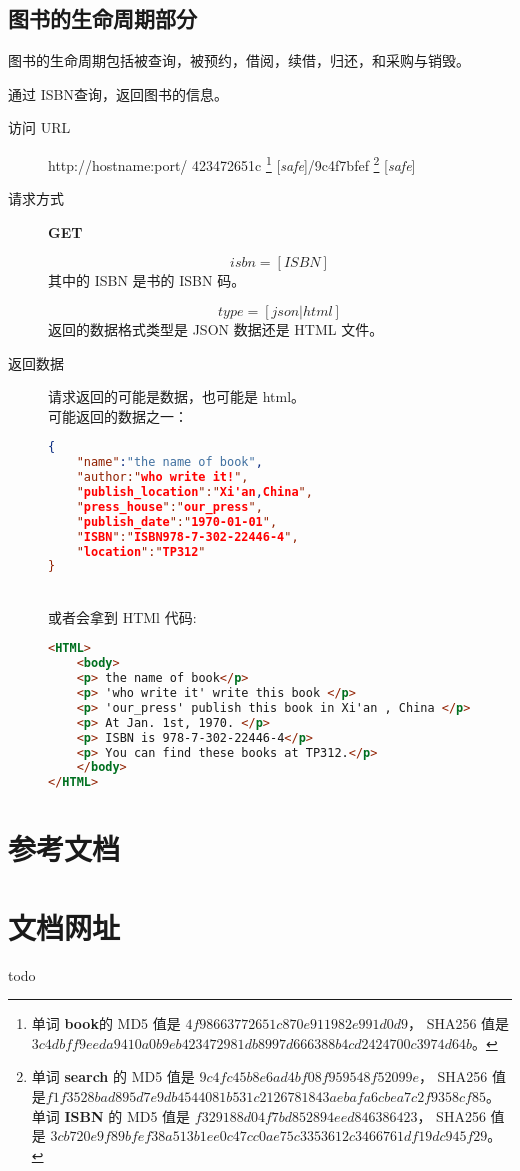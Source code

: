 \documentclass[UTF8]{article}
\def\safe{[\textit{safe}]}
\def\GET{\textbf{GET}}
\begin{document}
        \subsection{图书的生命周期部分}
        图书的生命周期包括被查询，被预约，借阅，续借，归还，和采购与销毁。






        通过 ISBN查询，返回图书的信息。
        \begin{description}

        	\item[访问 URL] http://hostname:port/
        	423472651c
        	\footnote{单词 \textbf{book}的
        		MD5 值是 $4f98663772651c870e911982e991d0d9$，
        		SHA256 值是 $3c4dbff9eeda9410a0b9eb423472981db8997d666388b4cd2424700c3974d64b$。
        		}
	        \safe/9c4f7bfef
	        \footnote{
	        	单词 \textbf{search} 的
	        	MD5 值是 $9c4fc45b8e6ad4bf08f959548f52099e$，
	        	SHA256 值是$f1f3528bad895d7e9db4544081b531c2126781843aebafa6cbea7c2f9358cf85$。
	        	单词 \textbf{ISBN} 的
	        	MD5 值是 $f329188d04f7bd852894eed846386423$，
	        	SHA256 值是 $3cb720e9f89bfef38a513b1ee0c47cc0ae75c3353612c3466761df19dc945f29$。
	        	}
	        \safe


	        \item[请求方式] \GET


	        $$isbn=[ISBN]$$
	        其中的 ISBN 是书的 ISBN 码。


	        $$type=[json|html]$$
	        返回的数据格式类型是 JSON 数据还是 HTML 文件。

	        \item[返回数据] 请求返回的可能是数据，也可能是 html。
	        \\ 可能返回的数据之一：
	        \begin{lstlisting}[language=JSON]
{
	"name":"the name of book",
	"author:"who write it!",
	"publish_location":"Xi'an,China",
	"press_house":"our_press",
	"publish_date":"1970-01-01",
	"ISBN":"ISBN978-7-302-22446-4",
	"location":"TP312"
}
	        \end{lstlisting}
	        \\ 或者会拿到 HTMl 代码:
	        \begin{lstlisting}[language=HTML]
<HTML>
	<body>
	<p> the name of book</p>
	<p> 'who write it' write this book </p>
	<p> 'our_press' publish this book in Xi'an , China </p>
	<p> At Jan. 1st, 1970. </p>
	<p> ISBN is 978-7-302-22446-4</p>
	<p> You can find these books at TP312.</p>
	</body>
</HTML>
	        \end{lstlisting}
        \end{description}










    \newpage
    \begin{appendices}
    \section{参考文档}
    \section{文档网址}
    todo
    \end{appendices}
\end{document}
